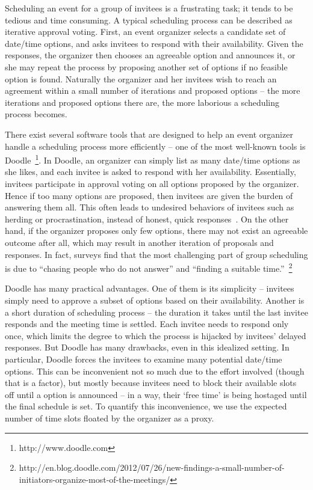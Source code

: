 \label{bdoodle:chapter}


Scheduling an event for a group of invitees is a frustrating task; it tends to be tedious and time consuming.
A typical scheduling process can be described as iterative approval voting.
First, an event organizer selects a candidate set of date/time options, and asks invitees to respond with their availability. 
Given the responses, the organizer then chooses an agreeable option and announces it, or she may repeat the process by proposing another set of options if no feasible option is found. 
Naturally the organizer and her invitees wish to reach an agreement within a small number of iterations and proposed options -- the more iterations and proposed options there are, the more laborious a scheduling process becomes. 

There exist several software tools that are designed to help an event organizer handle a scheduling process more efficiently -- one of the most well-known tools is Doodle~\footnote{http://www.doodle.com}. 
In Doodle, an organizer can simply list as many date/time options as she likes, 
and each invitee is asked to respond with her availability. 
Essentially, invitees participate in approval voting on all options proposed by the organizer.
Hence if too many options are proposed, then invitees are given the burden of answering them all. 
This often leads to undesired behaviors of invitees such as herding or procrastination, instead of honest, quick responses~\cite{zou2015strategic}. 
On the other hand, if the organizer proposes only few options, there may not exist an agreeable outcome after all, which may result in another iteration of proposals and responses. 
In fact, surveys find that the most challenging part of group scheduling is due to ``chasing people who do not answer'' and ``finding a suitable time.''~\footnote{http://en.blog.doodle.com/2012/07/26/new-findings-a-small-number-of-initiators-organize-most-of-the-meetings/}

Doodle has many practical advantages. 
One of them is its simplicity -- invitees simply need to approve a subset of options based on their availability.
Another is a short duration of scheduling process -- the duration it takes until
the last invitee responds and the meeting time is settled. Each invitee
needs to respond only once, which limits the degree to which the
process is hijacked by invitees' delayed responses. But Doodle has many
drawbacks, even in this idealized setting. In particular, Doodle
forces the invitees to examine many potential date/time options. This can be
inconvenient not so much due to the effort involved (though that is a
factor), but mostly because invitees need to block their available slots
off until a option is announced -- in a way, their `free time' is being hostaged until the final schedule is set.
To quantify this inconvenience, we use the expected number of time
slots floated by the organizer as a proxy.

